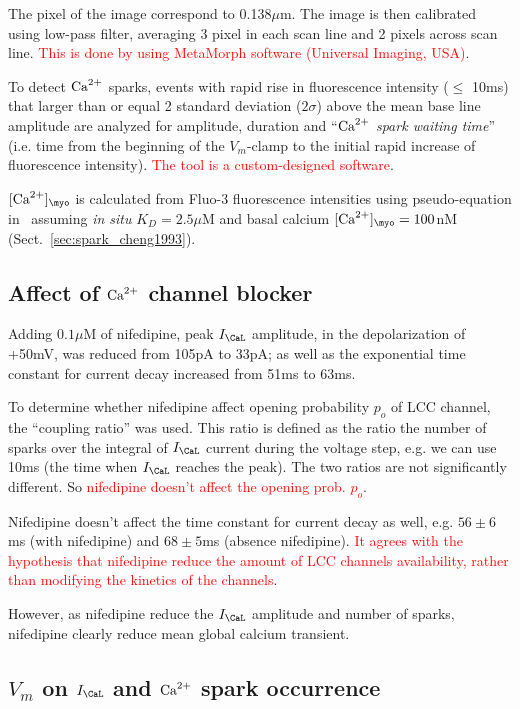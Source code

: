 The pixel of the image correspond to 0.138$\mu$m. The image is then
calibrated using low-pass filter, averaging 3 pixel in each scan line
and 2 pixels across scan line.
\textcolor{red}{This is done by using MetaMorph software (Universal
  Imaging, USA)}.

To detect ${\text{Ca}^{2+}}$ sparks, events with rapid rise in fluorescence
intensity ($\le$ 10ms) that larger than or equal 2 standard deviation
($2\sigma$) above the mean base line amplitude are analyzed for
amplitude, duration and ``{\it ${\text{Ca}^{2+}}$ spark waiting time}'' (i.e. time
from the beginning of the $V_m$-clamp to the initial rapid increase of
fluorescence intensity).
\textcolor{red}{The tool is a custom-designed software}.

$[\Ca]_\myo$ is calculated from Fluo-3 fluorescence intensities using
pseudo-equation in~\citep{cheng1993cse} assuming {\it in situ}
$K_D=2.5\mu$M and basal calcium $[\Ca]_\myo=100$nM
(Sect.~\ref{sec:spark_cheng1993}).

\subsection{Affect of ${\text{Ca}^{2+}}$ channel blocker}
\label{sec:affect-ca-channel}

Adding $0.1\mu$M of nifedipine, peak $I_\CaL$ amplitude, in the
depolarization of +50mV, was reduced from 105pA to 33pA; as well as
the exponential time constant for current decay increased from 51ms to
63ms. 

To determine whether nifedipine affect opening probability $p_o$ of
LCC channel, the ``coupling ratio'' was used. This ratio is defined as
the ratio the number of sparks over the integral of $I_\CaL$ current
during the voltage step, e.g. we can use 10ms (the time when $I_\CaL$
reaches the peak). The two ratios are not significantly different. So
\textcolor{red}{nifedipine doesn't affect the opening prob. $p_o$}.

Nifedipine doesn't affect the time constant for current decay as well,
e.g. $56\pm6$ms (with nifedipine) and $68\pm5$ms (absence
nifedipine).
\textcolor{red}{It agrees with the hypothesis that nifedipine reduce
  the amount of LCC channels availability, rather than modifying the
  kinetics of the channels}.


However, as nifedipine reduce the $I_\CaL$ amplitude and number of
sparks, nifedipine clearly reduce mean global calcium transient.

\subsection{$V_m$ on $I_\CaL$ and ${\text{Ca}^{2+}}$ spark occurrence }
\label{sec:v_m-i_cal-ca}

